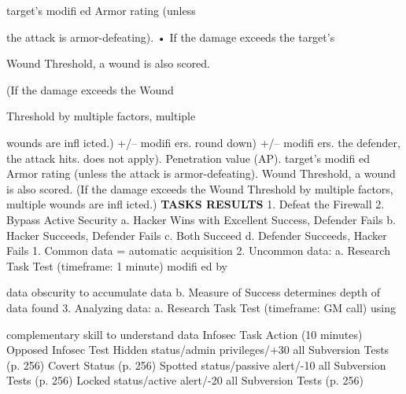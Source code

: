 target's modiﬁ ed Armor rating (unless 

the attack is armor-defeating).
•  If the damage exceeds the target's 

Wound Threshold, a wound is also scored. 

(If the damage exceeds the Wound 

Threshold by multiple factors, multiple 

wounds are inﬂ icted.)
+/– modiﬁ ers.
round down) +/– modiﬁ ers.
the defender, the attack hits.
does not apply).
Penetration value (AP).
target's modiﬁ ed Armor rating (unless 
the attack is armor-defeating).
Wound Threshold, a wound is also scored. 
(If the damage exceeds the Wound 
Threshold by multiple factors, multiple 
wounds are inﬂ icted.)
\textbf{TASKS RESULTS}
1. Defeat the Firewall 
2. Bypass Active Security 
  a. Hacker Wins with Excellent Success, Defender Fails 
  b. Hacker Succeeds, Defender Fails 
  c. Both Succeed 
  d. Defender Succeeds, Hacker Fails 
1. Common data = automatic acquisition
2. Uncommon data:
  a. Research Task Test (timeframe: 1 minute) modiﬁ ed by 

data obscurity to accumulate data
  b. Measure of Success determines depth of data found
3. Analyzing data:
  a. Research Task Test (timeframe: GM call) using 

complementary skill to understand data
Infosec Task Action (10 minutes)
Opposed Infosec Test
Hidden status/admin privileges/+30 all Subversion Tests (p. 256)
Covert Status (p. 256)
Spotted status/passive alert/-10 all Subversion Tests (p. 256)
Locked status/active alert/-20 all Subversion Tests (p. 256) 

